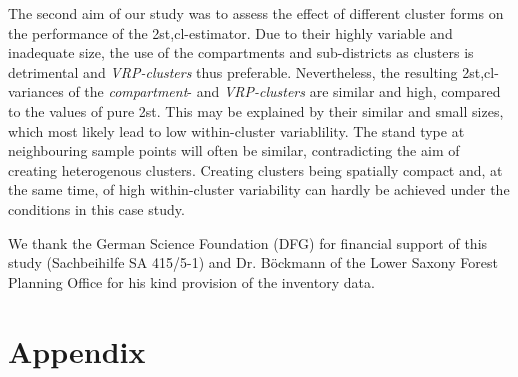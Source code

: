 The second aim of our study was to assess the effect of different cluster forms on the performance of the 2st,cl-estimator. Due to their highly variable and inadequate size, the use of the compartments and sub-districts as clusters is detrimental and \textit{VRP-clusters} thus preferable. Nevertheless, the resulting 2st,cl-variances of the \textit{compartment}- and \textit{VRP-clusters} are similar and high, compared to the values of pure 2st. This may be explained by their similar and small sizes, which most likely lead to low within-cluster variablility. The stand type at neighbouring sample points will often be similar, contradicting the aim of creating heterogenous clusters. Creating clusters being spatially compact and, at the same time, of high within-cluster variability can hardly be achieved under the conditions in this case study.
\begin{acknowledgements}
We thank the German Science Foundation (DFG) for financial support of this study (Sachbeihilfe SA 415/5-1) and Dr. Böckmann of the Lower Saxony Forest Planning Office for his kind provision of the inventory data.
\end{acknowledgements}





\appendix
\section{Appendix}
\label{sec:app}
\renewcommand{\theequation}{\thesection.\arabic{equation}} 
\renewcommand{\thetable}{\thesection.\arabic{table}} 
\setcounter{equation}{0}
\setcounter{table}{0}

